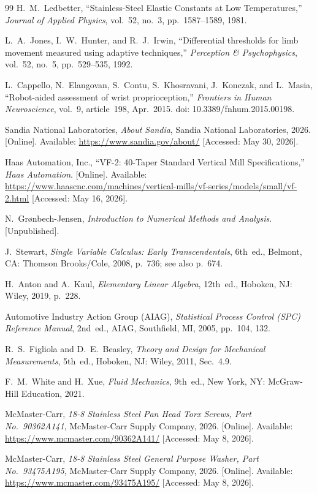 \documentclass[12pt, letterpaper]{report}%
\begin{document}
\begin{thebibliography}{99}
	H.\ M.\ Ledbetter,
	``Stainless-Steel Elastic Constants at Low Temperatures,''
	\textit{Journal of Applied Physics}, vol.~52, no.~3, pp.~1587--1589, 1981.

	L.\ A.\ Jones, I.\ W.\ Hunter, and R.\ J.\ Irwin,
	``Differential thresholds for limb movement measured using adaptive techniques,''
	\textit{Perception \& Psychophysics}, vol.~52, no.~5, pp.~529--535, 1992.

	L.\ Cappello, N.\ Elangovan, S.\ Contu, S.\ Khosravani, J.\ Konczak,
	and L.\ Masia,
	``Robot-aided assessment of wrist proprioception,''
	\textit{Frontiers in Human Neuroscience}, vol.~9, article~198, Apr.\ 2015.
	doi: 10.3389/fnhum.2015.00198.

	Sandia National Laboratories, \textit{About Sandia},
	Sandia National Laboratories, 2026. [Online].
	Available: \url{https://www.sandia.gov/about/}
	[Accessed: May 30, 2026].

	Haas Automation, Inc.,
	``VF-2: 40-Taper Standard Vertical Mill Specifications,''
	\textit{Haas Automation}. [Online].
	Available: \url{https://www.haascnc.com/machines/vertical-mills/vf-series/models/small/vf-2.html}
	[Accessed: May 16, 2026].

	N.\ Grønbech-Jensen,
	\textit{Introduction to Numerical Methods and Analysis}.
	[Unpublished].

	J.\ Stewart, \textit{Single Variable Calculus: Early Transcendentals},
	6th~ed., Belmont, CA: Thomson Brooks/Cole, 2008, p.~736; see also p.~674.

	H.\ Anton and A.\ Kaul, \textit{Elementary Linear Algebra},
	12th~ed., Hoboken, NJ: Wiley, 2019, p.~228.

	Automotive Industry Action Group (AIAG),
	\textit{Statistical Process Control (SPC) Reference Manual},
	2nd~ed., AIAG, Southfield, MI, 2005, pp.~104, 132.

	R.\ S.\ Figliola and D.\ E.\ Beasley,
	\textit{Theory and Design for Mechanical Measurements},
	5th~ed., Hoboken, NJ: Wiley, 2011, Sec.~4.9.

	F.\ M.\ White and H.\ Xue,
	\textit{Fluid Mechanics}, 9th~ed.,
	New York, NY: McGraw-Hill Education, 2021.

	McMaster-Carr, \textit{18-8 Stainless Steel Pan Head Torx Screws,
	Part No.\ 90362A141}, McMaster-Carr Supply Company, 2026. [Online].
	Available: \url{https://www.mcmaster.com/90362A141/}
	[Accessed: May 8, 2026].

	McMaster-Carr, \textit{18-8 Stainless Steel General Purpose Washer,
	Part No.\ 93475A195}, McMaster-Carr Supply Company, 2026. [Online].
	Available: \url{https://www.mcmaster.com/93475A195/}
	[Accessed: May 8, 2026].

\end{thebibliography}
\end{document}
